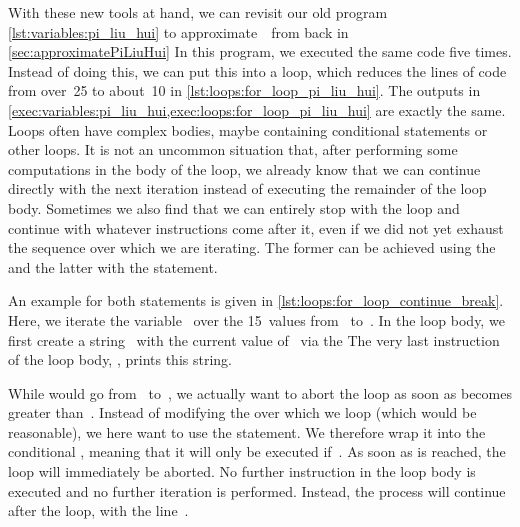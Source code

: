 With these new tools at hand, we can revisit our old program \cref{lst:variables:pi_liu_hui} to approximate~\numberPi\ from back in \cref{sec:approximatePiLiuHui}
In this program, we executed the same code five times.
Instead of doing this, we can put this into a loop, which reduces the lines of code from over~25 to about~10 in \cref{lst:loops:for_loop_pi_liu_hui}.
The outputs in \cref{exec:variables:pi_liu_hui,exec:loops:for_loop_pi_liu_hui} are exactly the same.%
%
\FloatBarrier%
\endhsection%
%
%
%
%
%
Loops often have complex bodies, maybe containing conditional statements or other loops.
It is not an uncommon situation that, after performing some computations in the body of the loop, we already know that we can continue directly with the next iteration instead of executing the remainder of the loop body.
Sometimes we also find that we can entirely stop with the loop and continue with whatever instructions come after it, even if we did not yet exhaust the sequence over which we are iterating.
The former can be achieved using the  and the latter with the  statement.

An example for both statements is given in \cref{lst:loops:for_loop_continue_break}.
Here, we iterate the variable~ over the 15~values from~ to~.
In the loop body, we first create a string~ with the current value of~ via the  
The very last instruction of the loop body, , prints this string.

While  would go from~ to~, we actually want to abort the loop as soon as  becomes greater than~.
Instead of modifying the  over which we loop (which would be reasonable), we here want to use the  statement.
We therefore wrap it into the conditional , meaning that it will only be executed if~.
As soon as  is reached, the loop will immediately be aborted.
No further instruction in the loop body is executed and no further iteration is performed.
Instead, the process will continue after the loop, with the line~.

